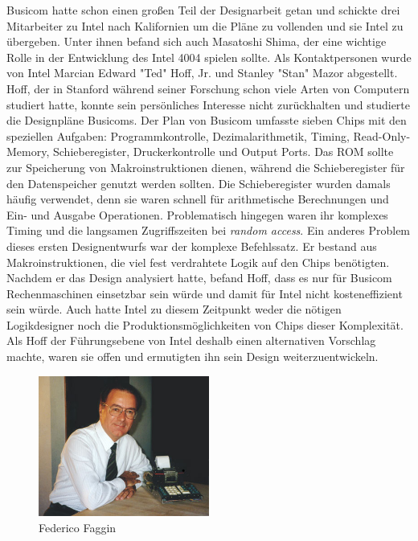 Busicom hatte schon einen großen Teil der Designarbeit getan und schickte drei Mitarbeiter zu Intel nach Kalifornien um die Pläne zu vollenden und sie Intel zu übergeben.
Unter ihnen befand sich auch Masatoshi Shima, der eine wichtige Rolle in der Entwicklung des Intel 4004 spielen sollte. Als Kontaktpersonen wurde von Intel Marcian Edward "Ted" Hoff, Jr. und Stanley "Stan" Mazor abgestellt. Hoff, der in Stanford während seiner Forschung schon viele Arten von Computern studiert hatte, konnte sein persönliches Interesse nicht zurückhalten und studierte die Designpläne Busicoms. Der Plan von Busicom umfasste sieben Chips mit den speziellen Aufgaben: Programmkontrolle, Dezimalarithmetik, Timing, Read-Only-Memory, Schieberegister, Druckerkontrolle und Output Ports. Das ROM sollte zur Speicherung von Makroinstruktionen dienen, während die Schieberegister für den Datenspeicher genutzt werden sollten. Die Schieberegister wurden damals häufig verwendet, denn sie waren schnell für arithmetische Berechnungen und Ein- und Ausgabe Operationen. Problematisch hingegen waren ihr komplexes Timing und die langsamen Zugriffszeiten bei \textit{random access}. Ein anderes Problem dieses ersten Designentwurfs war der komplexe Befehlssatz. Er bestand aus Makroinstruktionen, die viel fest verdrahtete Logik auf den Chips benötigten.
Nachdem er das Design analysiert hatte, befand Hoff, dass es nur für Busicom Rechenmaschinen einsetzbar sein würde und damit für Intel nicht kosteneffizient sein würde. Auch hatte Intel zu diesem Zeitpunkt weder die nötigen Logikdesigner noch die Produktionsmöglichkeiten von Chips dieser Komplexität. Als Hoff der Führungsebene von Intel deshalb einen alternativen Vorschlag machte, waren sie offen und ermutigten ihn sein Design weiterzuentwickeln.
\newline
\vspace{-23pt}
\begin{figure}
	\vspace{-5pt}
	\includegraphics[width=0.5\textwidth]{figures/faggin.jpg}
	\caption{Federico Faggin}
	\label{fig:creators2}
	\vspace{-5pt}
\end{figure} 

